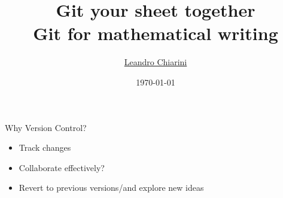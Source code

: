 \documentclass[12pt,t]{beamer}
\title{{\Huge Git your sheet together} \\ Git for mathematical writing}
\author{\href{http://lchiarini.com}{Leandro Chiarini}}
\institute{Durham University}
\date{\today \\
	\vspace{2em}
}
\begin{document}
{
\frame{ \titlepage
   } }


\begin{frame}{Why Version Control?}
\begin{itemize}
		\pause
		\vspace{1em}
    \item Track changes 
		\pause
		\vspace{1em}
    \item Collaborate effectively?
		\pause
		\vspace{1em}
    \item Revert to previous versions/and explore new ideas
		\pause
\end{itemize}

\end{frame}
\end{document}
